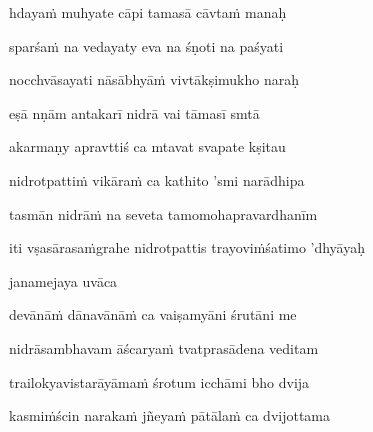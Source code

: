 hdayaṁ muhyate cāpi tamasā cāvtaṁ manaḥ\thinspace{\dandab} \dontdisplaylinenum

sparśaṁ na vedayaty eva na śṇoti na paśyati \veg\dontdisplaylinenum

nocchvāsayati nāsābhyāṁ vivtākṣimukho naraḥ\thinspace{\dandab} \dontdisplaylinenum

eṣā nṇām antakarī nidrā vai tāmasī smtā \veg\dontdisplaylinenum
{}

akarmaṇy apravttiś ca mtavat svapate kṣitau\thinspace{\dandab} \dontdisplaylinenum

nidrotpattiṁ vikāraṁ ca kathito 'smi narādhipa \danda\dontdisplaylinenum

tasmān nidrāṁ na seveta tamomohapravardhanīm \veg\dontdisplaylinenum


\jump
\begin{center}
\ketdanda iti vṣasārasaṁgrahe nidrotpattis trayoviṁśatimo 'dhyāyaḥ\ketdanda
\end{center}
\dontdisplaylinenum\vers 
{}
\bekveg\szamveg\vfill\phpspagebreak\szam\bek{}
\thispagestyle{empty}



\jump\jump
\vers

janamejaya uvāca~{\dandab}\dontdisplaylinenum 

devānāṁ dānavānāṁ ca vaiṣamyāni śrutāni me\thinspace{\danda} \dontdisplaylinenum

nidrāsambhavam āścaryaṁ tvatprasādena veditam \veg\dontdisplaylinenum
{}

trailokyavistarāyāmaṁ śrotum icchāmi bho dvija\thinspace{\dandab} \dontdisplaylinenum

kasmiṁścin narakaṁ jñeyaṁ pātālaṁ ca dvijottama \veg\dontdisplaylinenum
{}

